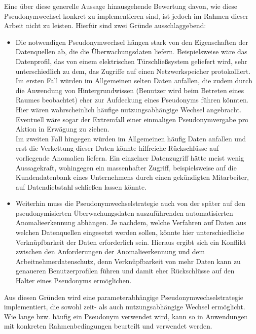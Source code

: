 Eine über diese generelle Aussage hinausgehende Bewertung davon, wie diese Pseudonymwechsel konkret zu implementieren sind, ist jedoch im Rahmen dieser Arbeit nicht zu leisten. Hierfür sind zwei Gründe ausschlaggebend:
\begin{itemize}
  \item Die notwendigen Pseudonymwechsel hängen stark von den Eigenschaften der Datenquellen ab, die die Überwachungsdaten liefern. Beispielsweise wäre das Datenprofil, das von einem elektrischen Türschließsystem geliefert wird, sehr unterschiedlich zu dem, das Zugriffe auf einen Netzwerkspeicher protokolliert.\\
  Im ersten Fall würden im Allgemeinen selten Daten anfallen, die zudem durch die Anwendung von Hintergrundwissen (Benutzer wird beim Betreten eines Raumes beobachtet) eher zur Aufdeckung eines Pseudonyms führen könnten. Hier wären wahrscheinlich häufige nutzungsabhängige Wechsel angebracht. Eventuell wäre sogar der Extremfall einer einmaligen Pseudonymvergabe pro Aktion in Erwägung zu ziehen.\\
  Im zweiten Fall hingegen würden im Allgemeinen häufig Daten anfallen und erst die Verkettung dieser Daten könnte hilfreiche Rückschlüsse auf vorliegende Anomalien liefern. Ein einzelner Datenzugriff hätte meist wenig Aussagekraft, wohingegen ein massenhafter Zugriff, beispielsweise auf die Kundendatenbank eines Unternehmens durch einen gekündigten Mitarbeiter, auf Datendiebstahl schließen lassen könnte.
  
  \item Weiterhin muss die Pseudonymwechselstrategie auch von der später auf den pseudonymisierten Überwachungsdaten auszuführenden automatisierten Anomalieerkennung abhängen. Je nachdem, welche Verfahren auf Daten aus welchen Datenquellen eingesetzt werden sollen, könnte hier unterschiedliche Verknüpfbarkeit der Daten erforderlich sein. Hieraus ergibt sich ein Konflikt zwischen den Anforderungen der Anomalieerkennung und dem Arbeitnehmerdatenschutz, denn Verknüpfbarkeit von mehr Daten kann zu genaueren Benutzerprofilen führen und damit eher Rückschlüsse auf den Halter eines Pseudonyms ermöglichen.
\end{itemize}

Aus diesen Gründen wird eine parameterabhängige Pseudonymwechselstrategie implementiert, die sowohl zeit- als auch nutzungsabhängige Wechsel ermöglicht. Wie lange bzw. häufig ein Pseudonym verwendet wird, kann so in Anwendungen mit konkreten Rahmenbedingungen beurteilt und verwendet werden.

